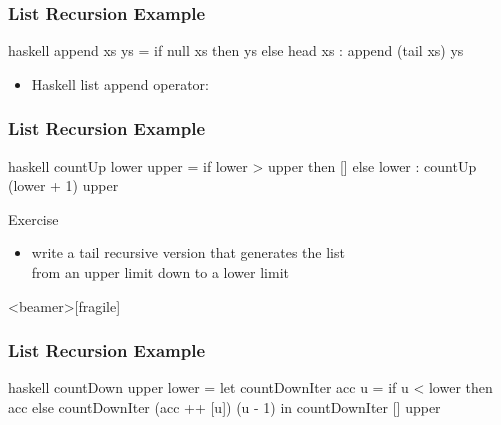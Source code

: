 \documentclass[dvipsnames]{beamer}
\theoremstyle{plain}
\begin{document}
\begin{frame}[fragile]
  \frametitle{List Recursion Example}

  \begin{example}
    \pause
    \begin{pygments}{haskell}
append xs ys =
    if null xs
    then ys
    else head xs : append (tail xs) ys
    \end{pygments}
  \end{example}

  \pause
  \begin{itemize}
    \item Haskell list append operator: 
  \end{itemize}
\end{frame}

\begin{frame}[fragile]
  \frametitle{List Recursion Example}

  \begin{example}
    \pause
    \begin{pygments}{haskell}
countUp lower upper =
    if lower > upper
    then []
    else lower : countUp (lower + 1) upper
    \end{pygments}
  \end{example}

  \pause
  \begin{block}{Exercise}
    \begin{itemize}
      \item write a tail recursive version that generates the list\\
        from an upper limit down to a lower limit
    \end{itemize}
  \end{block}
\end{frame}

\begin{frame}<beamer>[fragile]
  \frametitle{List Recursion Example}

  \begin{example}
    \begin{pygments}{haskell}
countDown upper lower =
    let
        countDownIter acc u =
            if u < lower
            then acc
            else countDownIter (acc ++ [u]) (u - 1)
    in
        countDownIter [] upper
    \end{pygments}

  \end{example}
\end{frame}
\end{document}
